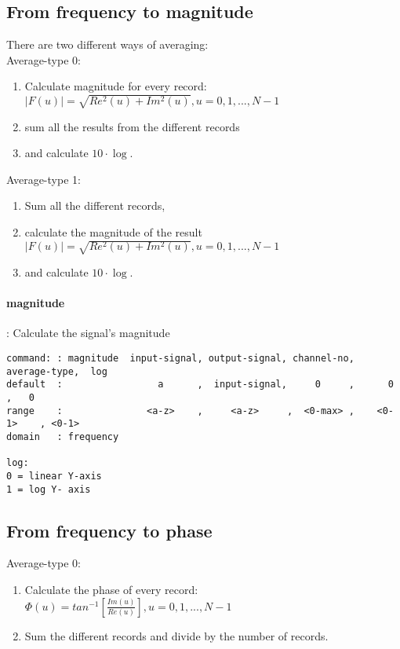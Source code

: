 \documentclass{report}
\newcommand{\bc}{\scriptsize}
\newcommand{\ec}{\normalsize}
\begin{document}
\subsection{From frequency to magnitude}\label{sec:freqtomag}

There are two different ways of averaging:\\

Average-type 0:

\begin{enumerate}
\item Calculate magnitude for every record:\\
       \( |F(u)| = \sqrt{ Re^{2}(u) + Im^{2}(u) } , u = 0,1,...,N-1 \)
\item sum all the results from the different records
\item and calculate \( 10\cdot\log \).
\end{enumerate}

Average-type 1:

\begin{enumerate}
\item Sum all the different records,
\item calculate the magnitude of the result\\
   \( |F( u)| = \sqrt{ Re^{2}( u) + Im^{2}( u) } , u = 0,1,...,N-1 \)
\item and calculate \( 10\cdot\log \).
\end{enumerate}
\paragraph{magnitude}: Calculate the signal's magnitude

\bc
\begin{verbatim}
command: : magnitude  input-signal, output-signal, channel-no, average-type,  log
default  :                 a      ,  input-signal,     0     ,      0      ,   0
range    :               <a-z>    ,     <a-z>     ,  <0-max> ,    <0-1>    , <0-1>
domain   : frequency

log:
0 = linear Y-axis
1 = log Y- axis
\end{verbatim}
\ec

\subsection{From frequency to phase}\label{sec:freqtophas}

Average-type 0:

\begin{enumerate}
\item Calculate the phase of every record:\\
  \( \Phi(u) = tan^{-1}\left[ \frac{Im(u)}{Re(u)}\right],  u = 0, 1, ..., N-1\)
\item Sum the different records and divide by the number of records.
\end{enumerate}
\end{document}
